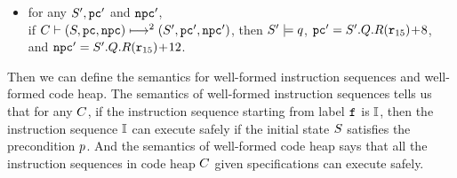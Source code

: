 \begin{definition}
\begin{itemize}
\begin{itemize}
			\item for any $\state', \pc'$ and $\npc'$, \\ 
			if
			$\multiptrans{2}{(\state, \pc, \npc)}{(\state', \pc', \npc')}$,
			then $\state' \models \astQ$,
            $\pc' = \state'.\Rstate.\RFile(\reg{15}) \!+\! 8$,
            and
            $\npc' = \state'.\Rstate.\RFile(\reg{15}) \!+\! 12$.
%				
		\end{itemize}
	\end{itemize}	
\end{definition}

Then we can define the semantics for well-formed instruction
sequences and well-formed code heap. 
The semantics of well-formed instruction sequences tells us that 
for any $\code$, if the instruction sequence starting from label 
$\lab{}$ is $\cblk$, then the instruction sequence $\cblk$ can 
execute safely if the initial state $\state$ satisfies the precondition 
$\astP$. And the semantics of well-formed code heap says that 
all the instruction sequences in code heap $\code$ given specifications 
can execute safely. 

